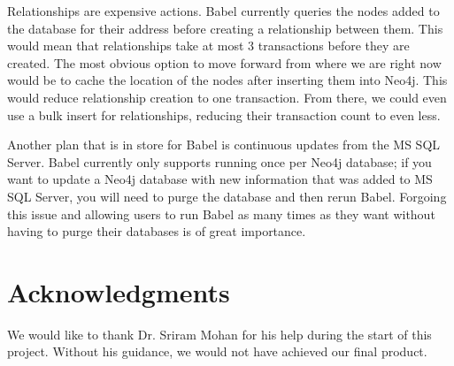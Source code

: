 \documentclass{acm_proc_article-sp}
\begin{document}
Relationships are expensive actions. Babel currently queries the nodes added to the database for their address before creating a relationship between them. This would mean that relationships take at most 3 transactions before they are created. The most obvious option to move forward from where we are right now would be to cache the location of the nodes after inserting them into Neo4j. This would reduce relationship creation to one transaction. From there, we could even use a bulk insert for relationships, reducing their transaction count to even less.

Another plan that is in store for Babel is continuous updates from the MS SQL Server. Babel currently only supports running once per Neo4j database; if you want to update a Neo4j database with new information that was added to MS SQL Server, you will need to purge the database and then rerun Babel. Forgoing this issue and allowing users to run Babel as many times as they want without having to purge their databases is of great importance.

\section{Acknowledgments}

We would like to thank Dr. Sriram Mohan for his help during the start of this project. Without his guidance, we would not have achieved our final product.

%

%
\end{document}
